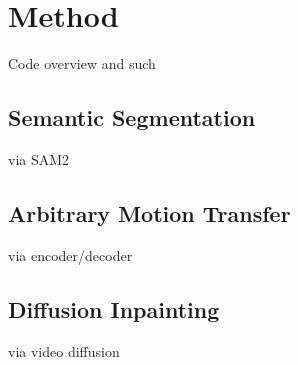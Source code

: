 \section{Method}

Code overview and such

\subsection{Semantic Segmentation}

via SAM2


\subsection{Arbitrary Motion Transfer}

via encoder/decoder

\subsection{Diffusion Inpainting}

via video diffusion
